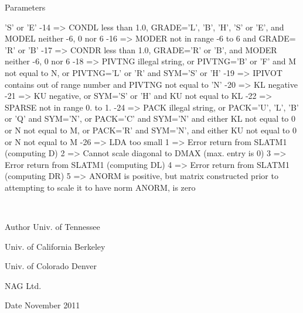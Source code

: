 \begin{DoxyParams}[1]{Parameters}
\begin{DoxyVerb}
                  'S' or 'E'
           -14 => CONDL less than 1.0, GRADE='L', 'B', 'H', 'S' or 'E',
                  and MODEL neither -6, 0 nor 6
           -16 => MODER not in range -6 to 6 and GRADE= 'R' or 'B'
           -17 => CONDR less than 1.0, GRADE='R' or 'B', and
                  MODER neither -6, 0 nor 6
           -18 => PIVTNG illegal string, or PIVTNG='B' or 'F' and
                  M not equal to N, or PIVTNG='L' or 'R' and SYM='S'
                  or 'H'
           -19 => IPIVOT contains out of range number and
                  PIVTNG not equal to 'N'
           -20 => KL negative
           -21 => KU negative, or SYM='S' or 'H' and KU not equal to KL
           -22 => SPARSE not in range 0. to 1.
           -24 => PACK illegal string, or PACK='U', 'L', 'B' or 'Q'
                  and SYM='N', or PACK='C' and SYM='N' and either KL
                  not equal to 0 or N not equal to M, or PACK='R' and
                  SYM='N', and either KU not equal to 0 or N not equal
                  to M
           -26 => LDA too small
             1 => Error return from SLATM1 (computing D)
             2 => Cannot scale diagonal to DMAX (max. entry is 0)
             3 => Error return from SLATM1 (computing DL)
             4 => Error return from SLATM1 (computing DR)
             5 => ANORM is positive, but matrix constructed prior to
                  attempting to scale it to have norm ANORM, is zero\end{DoxyVerb}
 \\
\hline
\end{DoxyParams}
\begin{DoxyAuthor}{Author}
Univ. of Tennessee 

Univ. of California Berkeley 

Univ. of Colorado Denver 

N\+A\+G Ltd. 
\end{DoxyAuthor}
\begin{DoxyDate}{Date}
November 2011 
\end{DoxyDate}
\hypertarget{group__real__matgen_gaa588d430895758d307f7d0243b9adfaa}{}
